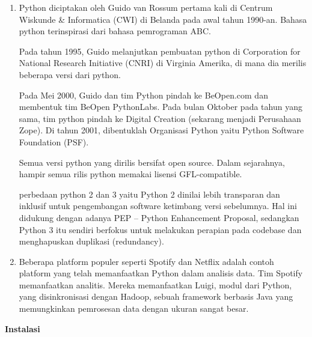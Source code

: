 \begin{enumerate}
    \item Python diciptakan oleh Guido van Rossum pertama kali di  Centrum Wiskunde & Informatica (CWI) di Belanda pada awal tahun 1990-an. Bahasa python terinspirasi dari bahasa pemrograman ABC. 
\par
Pada tahun 1995, Guido melanjutkan pembuatan python di Corporation for National Research Initiative (CNRI) di Virginia Amerika, di mana dia merilis beberapa versi dari python.
\par
Pada Mei 2000, Guido dan tim Python pindah ke BeOpen.com dan membentuk tim BeOpen PythonLabs. Pada bulan Oktober pada tahun yang sama, tim python pindah ke Digital Creation (sekarang menjadi Perusahaan Zope). Di tahun 2001, dibentuklah Organisasi Python yaitu Python Software Foundation (PSF).
\par
Semua versi python yang dirilis bersifat open source. Dalam sejarahnya, hampir semua rilis python memakai lisensi GFL-compatible.
\par
perbedaan python 2 dan 3 yaitu Python 2 dinilai lebih transparan dan inklusif untuk pengembangan software ketimbang versi sebelumnya. Hal ini didukung dengan adanya PEP – Python Enhancement Proposal, sedangkan Python 3 itu sendiri berfokus untuk melakukan perapian pada codebase dan menghapuskan duplikasi (redundancy).

\item Beberapa platform populer seperti Spotify dan Netflix adalah contoh platform yang telah memanfaatkan Python dalam analisis data. Tim Spotify memanfaatkan analitis. Mereka memanfaatkan Luigi, modul dari Python, yang disinkronisasi dengan Hadoop, sebuah framework berbasis Java yang memungkinkan pemrosesan data dengan ukuran sangat besar.
\end{enumerate}
\textbf{Instalasi}
